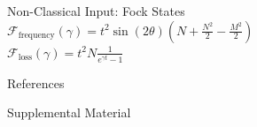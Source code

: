 \documentclass[final]{beamer}
\newlength{\sepwidth}
\newlength{\colwidth}
\newcommand{\separatorcolumn}{\begin{column}{\sepwidth}\end{column}}
\begin{document}
\begin{frame}[t]
\begin{columns}[t]
\begin{column}{\colwidth}
\begin{exampleblock}{Non-Classical Input: Fock States}
         \LARGE{$\mathcal{F}_{\text{frequency}}(\gamma) = t^{2}\sin(2\theta)\left( N+\frac{N^{2}}{2}-\frac{M^{2}}{2}\right)$}\\
         \LARGE{$\mathcal{F}_{\text{loss}}(\gamma) = t^{2}N \frac{1}{e^{\gamma t}-1}$}
  \end{exampleblock}


  \begin{block}{References}

    \nocite{*}
    \footnotesize{\printbibliography{}}

  \end{block}

  \begin{block}{Supplemental Material}
    
  \end{block}

\end{column}
\separatorcolumn
\end{columns}
\end{frame}
\end{document}
